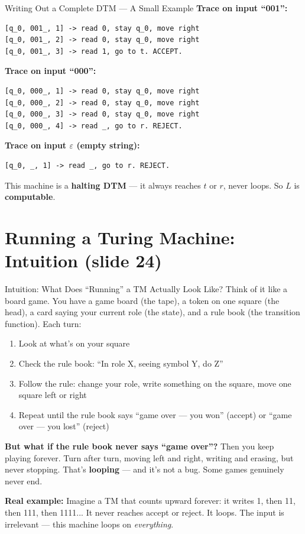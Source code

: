 \documentclass[11pt,a4paper]{article}
\begin{document}
\begin{examplebox}{Writing Out a Complete DTM --- A Small Example}
\textbf{Trace on input ``001'':}
\begin{lstlisting}
[q_0, 001_, 1] -> read 0, stay q_0, move right
[q_0, 001_, 2] -> read 0, stay q_0, move right
[q_0, 001_, 3] -> read 1, go to t. ACCEPT.
\end{lstlisting}

\textbf{Trace on input ``000'':}
\begin{lstlisting}
[q_0, 000_, 1] -> read 0, stay q_0, move right
[q_0, 000_, 2] -> read 0, stay q_0, move right
[q_0, 000_, 3] -> read 0, stay q_0, move right
[q_0, 000_, 4] -> read _, go to r. REJECT.
\end{lstlisting}

\textbf{Trace on input $\varepsilon$ (empty string):}
\begin{lstlisting}
[q_0, _, 1] -> read _, go to r. REJECT.
\end{lstlisting}

This machine is a \textbf{halting DTM} --- it always reaches $t$ or $r$, never loops. So $L$ is \textbf{computable}.
\end{examplebox}


\newpage
\section{Running a Turing Machine: Intuition (slide 24)}

\begin{conceptbox}{Intuition: What Does ``Running'' a TM Actually Look Like?}
Think of it like a board game. You have a game board (the tape), a token on one square (the head), a card saying your current role (the state), and a rule book (the transition function). Each turn:
\begin{enumerate}[nosep]
\item Look at what's on your square
\item Check the rule book: ``In role X, seeing symbol Y, do Z''
\item Follow the rule: change your role, write something on the square, move one square left or right
\item Repeat until the rule book says ``game over --- you won'' (accept) or ``game over --- you lost'' (reject)
\end{enumerate}

\textbf{But what if the rule book never says ``game over''?} Then you keep playing forever. Turn after turn, moving left and right, writing and erasing, but never stopping. That's \textbf{looping} --- and it's not a bug. Some games genuinely never end.

\textbf{Real example:} Imagine a TM that counts upward forever: it writes 1, then 11, then 111, then 1111... It never reaches accept or reject. It loops. The input is irrelevant --- this machine loops on \textit{everything}.
\end{conceptbox}
\end{document}
